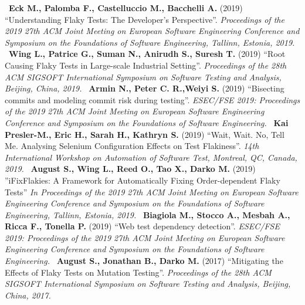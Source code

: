 \newline~\newline
[S16] \textbf{Eck M., Palomba F., Castelluccio M., Bacchelli A.} (2019)
“Understanding Flaky Tests: The Developer’s Perspective”. \emph{Proceedings of the 2019 27th ACM Joint Meeting on European Software Engineering Conference and Symposium on the Foundations of Software Engineering, Tallinn, Estonia, 2019.}
\newline~\newline
[S17] \textbf{Wing L., Patrice G., Suman N., Anirudh S., Suresh T.} (2019) “Root Causing Flaky Tests in Large-scale Industrial Setting”. \emph{Proceedings of the 28th ACM SIGSOFT International Symposium on Software Testing and Analysis, Beijing, China, 2019.}
\newline~\newline
[S18] \textbf{Armin N., Peter C. R.,Weiyi S.} (2019) “Bisecting commits and modeling commit risk during testing”. \emph{ESEC/FSE 2019: Proceedings of the 2019 27th ACM Joint Meeting on European Software Engineering Conference and Symposium on the Foundations of Software Engineering.}
\newline~\newline
[S19] \textbf{Kai Presler-M., Eric H., Sarah H., Kathryn S.} (2019) “Wait, Wait. No, Tell Me. Analysing Selenium Configuration Effects on Test Flakiness”. \emph{14th International Workshop on Automation of Software Test, Montreal, QC, Canada, 2019.}
\newline~\newline
[S20] \textbf{August S., Wing L., Reed O., Tao X., Darko M.} (2019) ”iFixFlakies: A Framework for Automatically Fixing Order-dependent Flaky Tests” \emph{In Proceedings of the 2019 27th ACM Joint Meeting on European Software Engineering Conference and Symposium on the Foundations of Software Engineering, Tallinn, Estonia, 2019.}
\newline~\newline
[S21] \textbf{Biagiola M., Stocco A., Mesbah A., Ricca F., Tonella P.} (2019) “Web test dependency detection”. \emph{ESEC/FSE 2019: Proceedings of the 2019 27th ACM Joint Meeting on European Software Engineering Conference and Symposium on the Foundations of Software Engineering.}
\newline~\newline
[S22] \textbf{August S., Jonathan B., Darko M.} (2017) “Mitigating the Effects of Flaky Tests on Mutation Testing”. \emph{Proceedings of the 28th ACM SIGSOFT International Symposium on Software Testing and Analysis, Beijing, China, 2017.}

